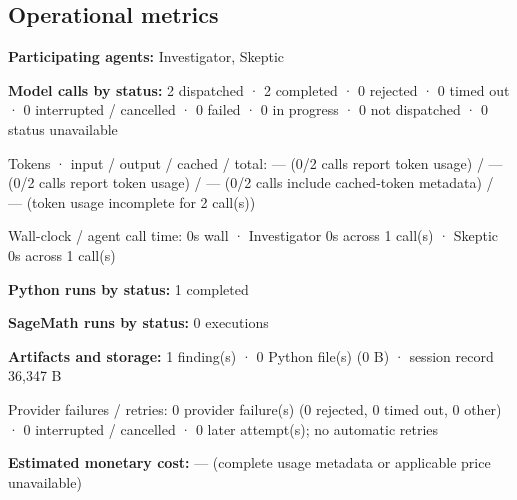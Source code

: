 \documentclass[11pt]{article}
\begin{document}
\subsection{Operational metrics}
\textbf{Participating agents:} Investigator, Skeptic\par
\textbf{Model calls by status:} 2 dispatched · 2 completed · 0 rejected · 0 timed out · 0 interrupted / cancelled · 0 failed · 0 in progress · 0 not dispatched · 0 status unavailable\par
Tokens · input / output / cached / total: — (0/2 calls report token usage) / — (0/2 calls report token usage) / — (0/2 calls include cached-token metadata) / — (token usage incomplete for 2 call(s))\par
Wall-clock / agent call time: 0s wall · Investigator 0s across 1 call(s) · Skeptic 0s across 1 call(s)\par
\textbf{Python runs by status:} 1 completed\par
\textbf{SageMath runs by status:} 0 executions\par
\textbf{Artifacts and storage:} 1 finding(s) · 0 Python file(s) (0 B) · session record 36,347 B\par
Provider failures / retries: 0 provider failure(s) (0 rejected, 0 timed out, 0 other) · 0 interrupted / cancelled · 0 later attempt(s); no automatic retries\par
\textbf{Estimated monetary cost:} — (complete usage metadata or applicable price unavailable)\par
\end{document}
